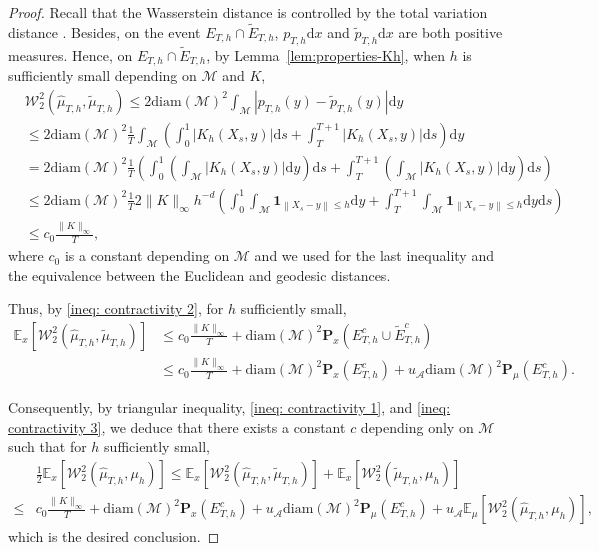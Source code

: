 \documentclass[10pt,a4paper]{article}
\newcommand{\E}{{\mathbb E}}
\renewcommand{\P}{{\mathbf P}}
\newcommand{\ind}{{\mathbf 1}}
\newcommand\cA{\mathcal{A}}
\newcommand\cM{\mathcal{M}}
\newcommand\cW{\mathcal{W}}
\newcommand\dd{\mathrm{d}}
\newcommand{\NRM}[1]{{{\left\| #1\right\|}}} %
\newcommand{\PAR}[1]{{{\left(#1\right)}}} %
\newcommand{\SBRA}[1]{{{\left[#1\right]}}} %
\begin{document}
\begin{proof}
 Recall that the Wasserstein distance is controlled by the total variation distance \cite[Theorem 6.15]{villani2009optimal}.
Besides, on the event $E_{T,h}\cap \widetilde{E}_{T,h}$, $p_{T,h} \dd x$ and $\widetilde{p}_{T,h} \dd x$ are both positive measures. Hence, on $E_{T,h}\cap \widetilde{E}_{T,h}$, by Lemma~\ref{lem:properties-Kh}, when $h$ is sufficiently small depending on $\cM$ and $K$,
\begin{align*}
&\cW^2_2( \widehat{\mu}_{T,h}, \widetilde{\mu}_{T,h})\le 
2\mathrm{diam}(\cM)^2 \int_{\cM} |p_{T,h}(y)-\widetilde{p}_{T,h}(y)| \dd y \\ 
&\le 2\mathrm{diam}(\cM)^2 \frac{1}{T} \int_{\cM} \PAR{ \int_0^1 |K_h(X_s,y)| \dd s +\int_T^{T+1} |K_h(X_s,y)| \dd s }  \dd y \\
&=  2\mathrm{diam}(\cM)^2 \frac{1}{T}  \PAR{ \int_0^1 \PAR{ \int_{\cM} |K_h(X_s,y)| \dd y} \dd s +\int_T^{T+1} \PAR{ \int_{\cM} |K_h(X_s,y)| \dd y } \dd s }  \\
&\le  2\mathrm{diam}(\cM)^2\frac{1}{T} 2\| K\|_{\infty} h^{-d} \PAR{\int_0^1\int_{\cM}\ind_{\NRM{X_s-y}\le h}\dd y+\int_T^{T+1} \int_{\cM}\ind_{\NRM{X_s-y}\le h} \dd y\dd s} 
\\
&\le  c_0 \frac{\| K\|_{\infty}}{T},
\end{align*}
where $c_0$ is a constant depending on $\cM$ and we used  for the last inequality  and the equivalence between the Euclidean and geodesic distances.



Thus, by \eqref{ineq: contractivity 2},  for $h$ sufficiently small,
\begin{align}
    \E_{x}\SBRA{ \cW^2_2( \widehat{\mu}_{T,h}, \widetilde{\mu}_{T,h})} &\le c_0  \frac{\| K\|_{\infty}}{T}  + \mathrm{diam}(\cM)^2\P_{x}\PAR{E^c_{T,h} \cup \widetilde{E}^c_{T,h}} \nonumber \\
    &\le c_0 \frac{\| K\|_{\infty}}{T} +\mathrm{diam}(\cM)^2 \P_{x}( E^c_{T,h})+u_\cA\mathrm{diam}(\cM)^2 \P_\mu(E^c_{T,h}) .\label{ineq: contractivity 3}
\end{align}
   



Consequently, by triangular inequality, \eqref{ineq: contractivity 1}, and \eqref{ineq: contractivity 3}, we deduce that there exists a constant $c$ depending only on $\cM$ such that for $h$ sufficiently small, 
\begin{align*}
    & \frac{1}{2}\E_{x}\SBRA{ \cW^2_2(\widehat{\mu}_{T,h}, \mu_h )} \le  \E_{x}\SBRA{\cW^2_2(\widehat{\mu}_{T,h}, \widetilde{\mu}_{T,h})} + \E_{x}\SBRA{ \cW^2_2(\widetilde{\mu}_{T,h}, \mu_h )}\\
    \le& c_0 \frac{ \| K\|_{\infty}}{T} + \mathrm{diam}(\cM)^2\P_{x}( E^c_{T,h})+u_\cA\mathrm{diam}(\cM)^2\P_\mu(E^c_{T,h})  +u_\cA \E_\mu\SBRA{\cW_2^2\PAR{\widehat{\mu}_{T,h} ,\mu_h}}, 
\end{align*}
which is the desired conclusion.
\end{proof}
\end{document}
